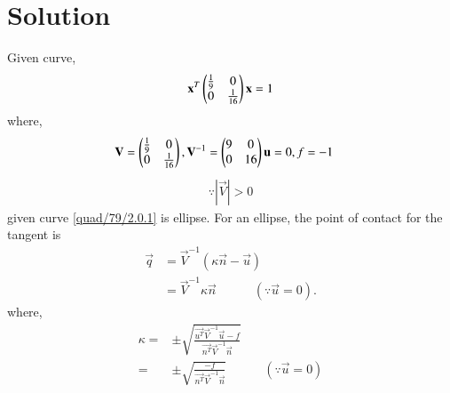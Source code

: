 \documentclass[journal,12pt,twocolumn]{IEEEtran}
\begin{document}
\section{Solution}
Given curve,
\begin{align}
\mathbf{x}^T\begin{pmatrix}\frac{1}{9} & 0 \\ 0 & \frac{1}{16}\end{pmatrix}\mathbf{x} = 1 \label{quad/79/2.0.1}
\end{align}
where,
\begin{align}
\mathbf{V}&=\begin{pmatrix}\frac{1}{9} & 0 \\ 0 & \frac{1}{16}\end{pmatrix},\mathbf{V}^{-1}=\begin{pmatrix}9&0\\0&16\end{pmatrix}\mathbf{u}=0, f = -1 
\end{align}
\begin{align}
\because |\vec{V}| > 0
\end{align}
given curve \eqref{quad/79/2.0.1} is ellipse.
For an ellipse, the point of contact for the tangent is
\begin{align}
\vec{q}&=\vec{V}^{-1}(\kappa\vec{n}-\vec{u})\\
&=\vec{V}^{-1}\kappa\vec{n}\quad\quad\quad(\because \vec{u}=0). \label{quad/79/2.0.5}
\end{align}
where,
\begin{align}
\kappa=&\pm \sqrt{\frac{\vec{u^T}\vec{V}^{-1}\vec{u}-f}{\vec{n^T}\vec{V}^{-1}\vec{n}}}\\
      =&\pm \sqrt{\frac{-f}{\vec{n^T}\vec{V}^{-1}\vec{n}}}\label{quad/79/2.0.7}\quad \quad\quad(\because \vec{u}=0)
\end{align}
\end{document}
